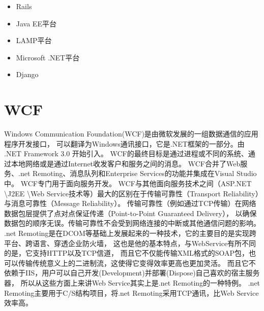 \documentclass{book}
\begin{document}
\begin{itemize}
\item{Rails}
\item{Java EE平台}
\item{LAMP平台}
\item{Microsoft .NET平台}
\item{Django}
\end{itemize}


%	

\clearpage
\mbox{}         
\clearpage

\chapter{WCF}
\label{sec:wcf}

Windows Communication Foundation(WCF)是由微软发展的一组数据通信的应用程序开发接口，
可以翻译为Windows通讯接口，它是.NET框架的一部分。由 .NET Framework 3.0 开始引入。
WCF的最终目标是通过进程或不同的系统、通过本地网络或是通过Internet收发客户和服务之间的消息。
WCF合并了Web服务、.net Remoting、消息队列和Enterprise Services的功能并集成在Visual Studio中。
WCF专门用于面向服务开发。
WCF与其他面向服务技术之间（ASP.NET \textbackslash J2EE \textbackslash Web Service技术等）最大的区别在于传输可靠性（Transport Reliability）与消息可靠性（Message Reliability）。
传输可靠性（例如通过TCP传输）在网络数据包层提供了点对点保证传递（Point-to-Point Guaranteed Delivery），
以确保数据包的顺序无误。传输可靠性不会受到网络连接的中断或其他通信问题的影响。
.net Remoting是在DCOM等基础上发展起来的一种技术，它的主要目的是实现跨平台、跨语言、穿透企业防火墙，
这也是他的基本特点，与WebService有所不同的是，它支持HTTP以及TCP信道，
而且它不仅能传输XML格式的SOAP包，也可以传输传统意义上的二进制流，这使得它变得效率更高也更加灵活。
而且它不依赖于IIS，用户可以自己开发(Development)并部署(Dispose)自己喜欢的宿主服务器，
所以从这些方面上来讲Web Service其实上是.net Remoting的一种特例。
.net Remoting主要用于C/S结构项目，将.net Remoting采用TCP通讯，比Web Service效率高。
\end{document}
